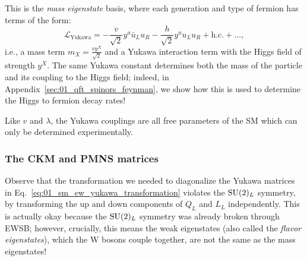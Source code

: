 This is the \textit{mass eigenstate} basis, where each generation and type of fermion has terms of the form:
\begin{equation}
	\label{eq:01_sm_ew_yukawa_mass}
	\mathcal{L}_\mathrm{Yukawa} = -\frac{v}{\sqrt{2}} y^u \bar u_L u_R - \frac{h}{\sqrt{2}} y^u u_L u_R + \text{h.c.} + \ldots,
\end{equation}
i.e., a mass term $m_X = \frac{v y^X}{\sqrt{2}}$ and a Yukawa interaction term with the Higgs field of strength $y^X$.
The same Yukawa constant determines both the mass of the particle and its coupling to the Higgs field;
indeed, in Appendix~\ref{sec:01_qft_spinors_feynman}, we show how this is used to determine the Higgs to fermion decay rates!

Like $v$ and $\lambda$, the Yukawa couplings are all free parameters of the SM which can only be determined experimentally.

\subsubsection{The CKM and PMNS matrices}

Observe that the transformation we needed to diagonalize the Yukawa matrices in Eq.~\ref{eq:01_sm_ew_yukawa_transformation} violates the $\SU[2]_L$ symmetry, by transforming the up and down components of $Q_L$ and $L_L$ independently.
This is actually okay because the $\SU[2]_L$ symmetry was already broken through EWSB; however, crucially, this means the weak eigenstates (also called the \textit{flavor eigenstates}), which the W bosons couple together, are not the same as the mass eigenstates!

